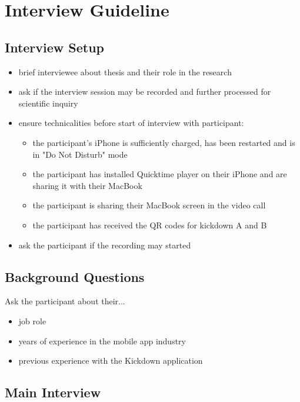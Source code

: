 \appendix

\section{Interview Guideline} \label{section::interview_guideline}
\subsection{Interview Setup}
\begin{itemize}
    \item brief interviewee about thesis and their role in the research
    \item ask if the interview session may be recorded and further processed for scientific inquiry
    \item ensure technicalities before start of interview with participant:
    \begin{itemize}
        \item the participant's iPhone is sufficiently charged, has been restarted and is in "Do Not Disturb" mode
        \item the participant has installed Quicktime player on their iPhone and are sharing it with their MacBook
        \item the participant is sharing their MacBook screen in the video call
        \item the participant has received the QR codes for kickdown A and B
    \end{itemize}
    \item ask the participant if the recording may started
\end{itemize}

\subsection{Background Questions}
Ask the participant about their...
\begin{itemize}
    \item job role
    \item years of experience in the mobile app industry
    \item previous experience with the Kickdown application
\end{itemize}

\subsection{Main Interview}
